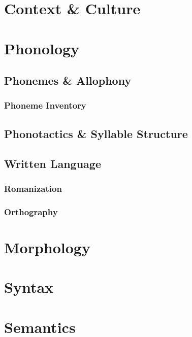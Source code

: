 \chapter{Context \& Culture}

\Blindtext[2]

\Blindtext[3]

\Blindtext[1]

\chapter{Phonology}

\section{Phonemes \& Allophony}

\subsection{Phoneme Inventory}

\section{Phonotactics \& Syllable Structure}

\section{Written Language}

\subsection{Romanization}

\subsection{Orthography}

\chapter{Morphology}

\chapter{Syntax}

\chapter{Semantics}
